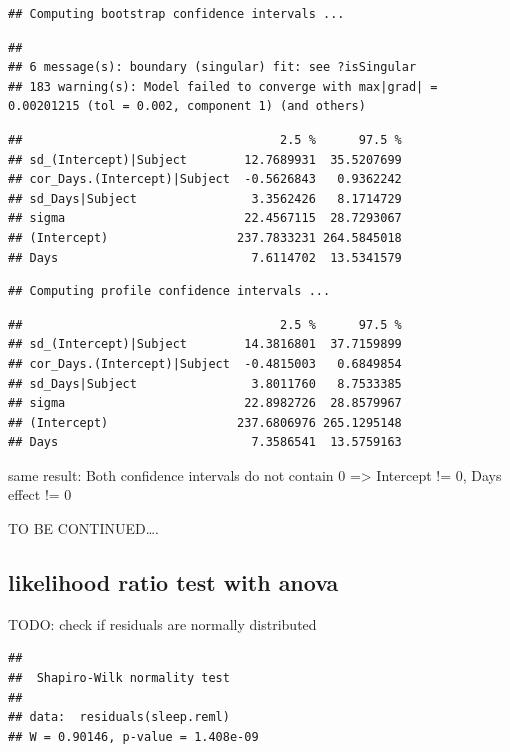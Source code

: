 \documentclass[
]{article}
\begin{document}
\begin{verbatim}
## Computing bootstrap confidence intervals ...
\end{verbatim}

\begin{verbatim}
## 
## 6 message(s): boundary (singular) fit: see ?isSingular
## 183 warning(s): Model failed to converge with max|grad| = 0.00201215 (tol = 0.002, component 1) (and others)
\end{verbatim}

\begin{verbatim}
##                                    2.5 %      97.5 %
## sd_(Intercept)|Subject        12.7689931  35.5207699
## cor_Days.(Intercept)|Subject  -0.5626843   0.9362242
## sd_Days|Subject                3.3562426   8.1714729
## sigma                         22.4567115  28.7293067
## (Intercept)                  237.7833231 264.5845018
## Days                           7.6114702  13.5341579
\end{verbatim}

\begin{verbatim}
## Computing profile confidence intervals ...
\end{verbatim}

\begin{verbatim}
##                                    2.5 %      97.5 %
## sd_(Intercept)|Subject        14.3816801  37.7159899
## cor_Days.(Intercept)|Subject  -0.4815003   0.6849854
## sd_Days|Subject                3.8011760   8.7533385
## sigma                         22.8982726  28.8579967
## (Intercept)                  237.6806976 265.1295148
## Days                           7.3586541  13.5759163
\end{verbatim}

same result: Both confidence intervals do not contain 0 =\textgreater{}
Intercept != 0, Days effect != 0

TO BE CONTINUED\ldots.

\hypertarget{likelihood-ratio-test-with-anova}{%
\subsection{likelihood ratio test with
anova}\label{likelihood-ratio-test-with-anova}}

TODO: check if residuals are normally distributed

\begin{verbatim}
## 
##  Shapiro-Wilk normality test
## 
## data:  residuals(sleep.reml)
## W = 0.90146, p-value = 1.408e-09
\end{verbatim}
\end{document}
